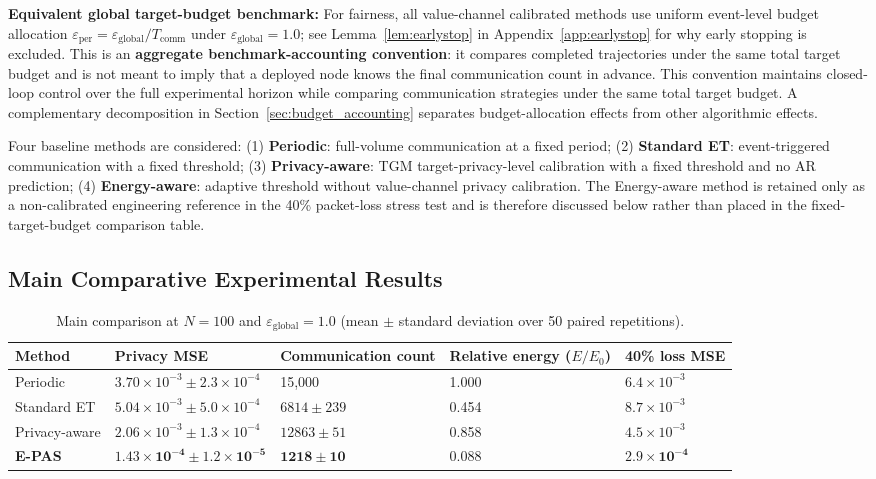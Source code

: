 \documentclass[10pt]{article}
\newcommand{\TGM}{TGM}
\newcommand{\AR}{AR}
\newcommand{\egl}{\varepsilon_{\text{global}}}
\newcommand{\eper}{\varepsilon_{\text{per}}}
\begin{document}
\textbf{Equivalent global target-budget benchmark:} For fairness, all value-channel calibrated methods use uniform event-level budget allocation $\eper=\egl/T_{\mathrm{comm}}$ under $\egl=1.0$; see Lemma~\ref{lem:earlystop} in Appendix~\ref{app:earlystop} for why early stopping is excluded. This is an \textbf{aggregate benchmark-accounting convention}: it compares completed trajectories under the same total target budget and is not meant to imply that a deployed node knows the final communication count in advance. This convention maintains closed-loop control over the full experimental horizon while comparing communication strategies under the same total target budget. A complementary decomposition in Section~\ref{sec:budget_accounting} separates budget-allocation effects from other algorithmic effects.

Four baseline methods are considered: (1) \textbf{Periodic}: full-volume communication at a fixed period; (2) \textbf{Standard ET}: event-triggered communication with a fixed threshold; (3) \textbf{Privacy-aware}: \TGM{} target-privacy-level calibration with a fixed threshold and no \AR{} prediction; (4) \textbf{Energy-aware}: adaptive threshold without value-channel privacy calibration. The Energy-aware method is retained only as a non-calibrated engineering reference in the 40\% packet-loss stress test and is therefore discussed below rather than placed in the fixed-target-budget comparison table.

\subsection{Main Comparative Experimental Results}\label{sec:main_results}


\begin{table}[htbp]
\caption{Main comparison at $N=100$ and $\egl=1.0$ (mean $\pm$ standard deviation over 50 paired repetitions).}
\label{tab:main}
\centering
\small
\begin{tabularx}{\textwidth}{@{}lXXXX@{}}
\toprule
Method & Privacy MSE & Communication count & Relative energy ($E/E_0$) & 40\% loss MSE \\
\midrule
Periodic        & $3.70\!\times\!10^{-3}\!\pm\!2.3\!\times\!10^{-4}$ & 15,000      & 1.000 & $6.4\!\times\!10^{-3}$ \\
Standard ET     & $5.04\!\times\!10^{-3}\!\pm\!5.0\!\times\!10^{-4}$ & $6814\pm239$  & 0.454 & $8.7\!\times\!10^{-3}$ \\
Privacy-aware   & $2.06\!\times\!10^{-3}\!\pm\!1.3\!\times\!10^{-4}$ & $12863\pm51$ & 0.858 & $4.5\!\times\!10^{-3}$ \\
\textbf{E-PAS}  & $\bm{1.43\!\times\!10^{-4}\!\pm\!1.2\!\times\!10^{-5}}$ & $\bm{1218\pm10}$ & $\bm{0.088}$ & $\bm{2.9\!\times\!10^{-4}}$ \\
\bottomrule
\end{tabularx}
\end{table}
\end{document}
